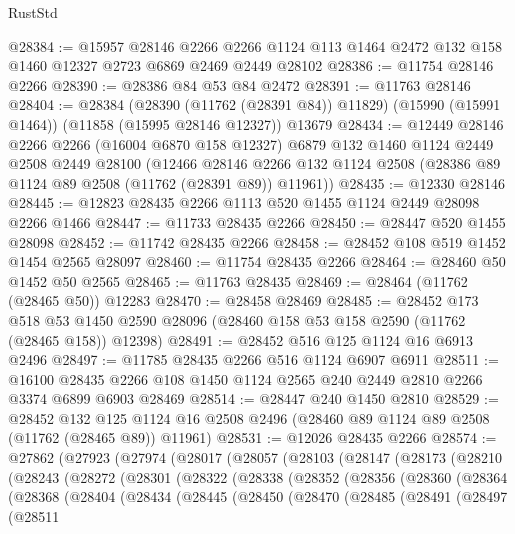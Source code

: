 \begin{lexlean}{RustStd}
\begin{coremodule}
@28384 := @15957
    @28146
    @2266
    @2266
    @1124
    @113
    @1464
    @2472
    @132
    @158
    @1460
    @12327
    @2723
    @6869
    @2469
    @2449
    @28102
@28386 := @11754 @28146 @2266
@28390 := @28386 @84 @53 @84 @2472
@28391 := @11763 @28146
@28404 := @28384
    (@28390 (@11762 (@28391 @84)) @11829)
    (@15990 (@15991 @1464))
    (@11858 (@15995 @28146 @12327))
    @13679
@28434 := @12449
    @28146
    @2266
    @2266
    (@16004 @6870 @158 @12327)
    @6879
    @132
    @1460
    @1124
    @2449
    @2508
    @2449
    @28100
    (@12466 @28146 @2266 @132 @1124 @2508 (@28386 @89 @1124 @89 @2508 (@11762 (@28391 @89)) @11961))
@28435 := @12330 @28146
@28445 := @12823 @28435 @2266 @1113 @520 @1455 @1124 @2449 @28098 @2266 @1466
@28447 := @11733 @28435 @2266
@28450 := @28447 @520 @1455 @28098
@28452 := @11742 @28435 @2266
@28458 := @28452 @108 @519 @1452 @1454 @2565 @28097
@28460 := @11754 @28435 @2266
@28464 := @28460 @50 @1452 @50 @2565
@28465 := @11763 @28435
@28469 := @28464 (@11762 (@28465 @50)) @12283
@28470 := @28458 @28469
@28485 := @28452
    @173
    @518
    @53
    @1450
    @2590
    @28096
    (@28460 @158 @53 @158 @2590 (@11762 (@28465 @158)) @12398)
@28491 := @28452 @516 @125 @1124 @16 @6913 @2496
@28497 := @11785 @28435 @2266 @516 @1124 @6907 @6911
@28511 := @16100 @28435 @2266 @108 @1450 @1124 @2565 @240 @2449 @2810 @2266 @3374 @6899 @6903 @28469
@28514 := @28447 @240 @1450 @2810
@28529 := @28452
    @132
    @125
    @1124
    @16
    @2508
    @2496
    (@28460 @89 @1124 @89 @2508 (@11762 (@28465 @89)) @11961)
@28531 := @12026 @28435 @2266
@28574 := @27862
    (@27923
      (@27974
        (@28017
          (@28057
            (@28103
              (@28147
                (@28173
                  (@28210
                    (@28243
                      (@28272
                        (@28301
                          (@28322
                            (@28338
                              (@28352
                                (@28356
                                  (@28360
                                    (@28364
                                      (@28368
                                        (@28404
                                          (@28434
                                            (@28445
                                              (@28450
                                                (@28470
                                                  (@28485
                                                    (@28491
                                                      (@28497
                                                        (@28511

\end{coremodule}
\end{lexlean}
